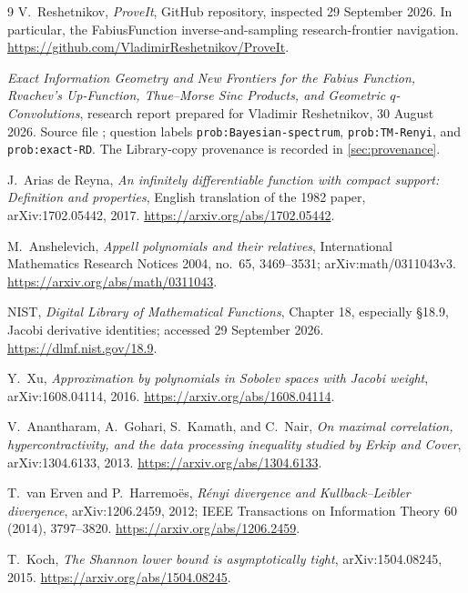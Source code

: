\documentclass[11pt,a4paper]{article}
\numberwithin{equation}{section}
\theoremstyle{definition}\newtheorem{definition}[theorem]{Definition}
\theoremstyle{remark}\newtheorem{remark}[theorem]{Remark}
\begin{document}
\begin{thebibliography}{9}
V.~Reshetnikov, \emph{ProveIt}, GitHub repository, inspected 29 September 2026. In particular, the FabiusFunction inverse-and-sampling research-frontier navigation.
\url{https://github.com/VladimirReshetnikov/ProveIt}.

\emph{Exact Information Geometry and New Frontiers for the Fabius Function, Rvachev's Up-Function, Thue--Morse Sinc Products, and Geometric $q$-Convolutions}, research report prepared for Vladimir Reshetnikov, 30 August 2026. Source file ; question labels \texttt{prob:Bayesian-spectrum}, \texttt{prob:TM-Renyi}, and \texttt{prob:exact-RD}. The Library-copy provenance is recorded in \cref{sec:provenance}.

J.~Arias de Reyna, \emph{An infinitely differentiable function with compact support: Definition and properties}, English translation of the 1982 paper, arXiv:1702.05442, 2017.
\url{https://arxiv.org/abs/1702.05442}.

M.~Anshelevich, \emph{Appell polynomials and their relatives}, International Mathematics Research Notices 2004, no.~65, 3469--3531; arXiv:math/0311043v3.
\url{https://arxiv.org/abs/math/0311043}.

NIST, \emph{Digital Library of Mathematical Functions}, Chapter 18, especially \S18.9, Jacobi derivative identities; accessed 29 September 2026.
\url{https://dlmf.nist.gov/18.9}.

Y.~Xu, \emph{Approximation by polynomials in Sobolev spaces with Jacobi weight}, arXiv:1608.04114, 2016.
\url{https://arxiv.org/abs/1608.04114}.

V.~Anantharam, A.~Gohari, S.~Kamath, and C.~Nair, \emph{On maximal correlation, hypercontractivity, and the data processing inequality studied by Erkip and Cover}, arXiv:1304.6133, 2013.
\url{https://arxiv.org/abs/1304.6133}.

T.~van Erven and P.~Harremo\"es, \emph{R\'enyi divergence and Kullback--Leibler divergence}, arXiv:1206.2459, 2012; IEEE Transactions on Information Theory 60 (2014), 3797--3820.
\url{https://arxiv.org/abs/1206.2459}.

T.~Koch, \emph{The Shannon lower bound is asymptotically tight}, arXiv:1504.08245, 2015.
\url{https://arxiv.org/abs/1504.08245}.
\end{thebibliography}
\end{document}

